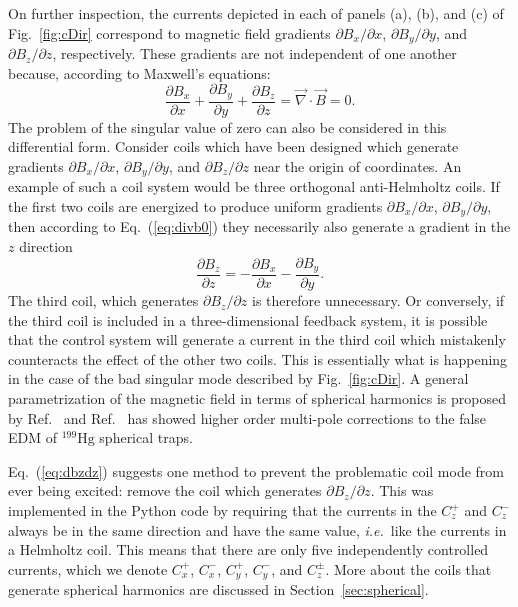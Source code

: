

On further inspection, the currents depicted in each of panels (a),
(b), and (c) of Fig.~\ref{fig:cDir} correspond to magnetic field
gradients $\partial B_x/\partial x$, $\partial B_y/\partial y$, and
$\partial B_z/\partial z$, respectively.  These gradients are not
independent of one another because, according to Maxwell's equations:
\begin{equation}
\frac{\partial B_x}{\partial x}+\frac{\partial B_y}{\partial y}+\frac{\partial B_z}{\partial z}=\vec{\nabla}\cdot\vec{B}=0.\label{eq:divb0}
\end{equation}
The problem of the singular value of zero can also be considered in
this differential form.  Consider coils which have been designed which
generate gradients $\partial B_x/\partial x$, $\partial B_y/\partial
y$, and $\partial B_z/\partial z$ near the origin of coordinates.  An
example of such a coil system would be three orthogonal anti-Helmholtz
coils.  If the first two coils are energized to produce uniform
gradients $\partial B_x/\partial x$, $\partial B_y/\partial y$, then
according to Eq.~(\ref{eq:divb0}) they necessarily also generate a
gradient in the $z$ direction
\begin{equation}
\frac{\partial B_z}{\partial z}=-\frac{\partial B_x}{\partial x}-\frac{\partial B_y}{\partial y}.\label{eq:dbzdz}
\end{equation}
The third coil, which generates $\partial B_z/\partial z$ is
therefore unnecessary.  Or conversely, if the third coil is included
in a three-dimensional feedback system, it is possible that the
control system will generate a current in the third coil which
mistakenly counteracts the effect of the other two coils.  This is
essentially what is happening in the case of the bad singular mode
described by Fig.~\ref{fig:cDir}. A general parametrization of the magnetic field in terms of spherical harmonics is proposed by Ref.~\cite{field_abel} and Ref.~\cite{field_jeff} has showed higher order multi-pole corrections to the false EDM of $\mathrm{^{199}Hg}$ spherical traps.

Eq.~(\ref{eq:dbzdz}) suggests one method to prevent the problematic
coil mode from ever being excited: remove the coil which generates
$\partial B_z/\partial z$. This was implemented in the Python
code by requiring that the currents in the $C_z^+$ and $C_z^-$ always
be in the same direction and have the same value, {\it i.e.}~like the
currents in a Helmholtz coil.  This means that there are only five
independently controlled currents, which we denote $C_x^+$, $C_x^-$,
$C_y^+$, $C_y^-$, and $C_z^\pm$.  More about the coils that generate spherical harmonics are discussed in Section~\ref{sec:spherical}.

